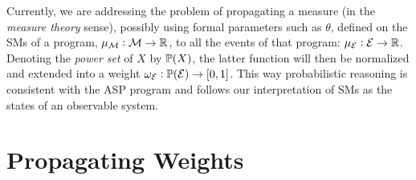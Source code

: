 \documentclass[x11names]{tlp}
\begin{document}
Currently, we are addressing the problem of propagating a measure (in the \emph{measure theory} sense), possibly using formal parameters such as
$\theta$, defined on the \aclp{SM} of a program, $\pwM: \MODELset \to
	\mathbb{R}$, to all the events of that program: $\pwE: \EVENTSset \to
	\mathbb{R}$.
Denoting the \emph{power set} of $X$ by $\powerset{X}$, the latter function will then be normalized and extended into a weight
$\wgtE:\powerset{\EVENTSset} \to \intcc{0,1}$.
This way probabilistic reasoning is consistent with the \ac{ASP} program and follows our interpretation of \aclp{SM} as the states of an observable system.

\section{Propagating Weights}
\label{sec:propagating.weights}
\end{document}
